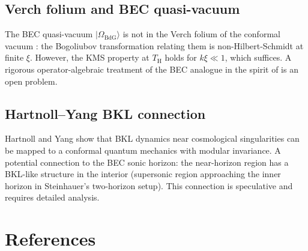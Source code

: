 \documentclass[12pt,a4paper]{article}
\renewcommand{\TH}{T_{\mathrm{H}}}
\begin{document}
\subsection{Verch folium and BEC quasi-vacuum}

The BEC quasi-vacuum $|\Omega_{\mathrm{BdG}}\rangle$ is not in the
Verch folium of the conformal vacuum \cite{verch1994}: the Bogoliubov
transformation relating them is non-Hilbert-Schmidt at finite $\xi$.
However, the KMS property at $\TH$ holds for $k\xi \ll 1$, which suffices.
A rigorous operator-algebraic treatment of the BEC analogue in the spirit
of \cite{witten2022} is an open problem.

\subsection{Hartnoll--Yang BKL connection}

Hartnoll and Yang \cite{hartnoll2025} show that BKL dynamics near
cosmological singularities can be mapped to a conformal quantum mechanics
with modular invariance.
A potential connection to the BEC sonic horizon: the near-horizon region
has a BKL-like structure in the interior (supersonic region approaching
the inner horizon in Steinhauer's two-horizon setup).
This connection is speculative and requires detailed analysis.

\section*{References}
\end{document}

